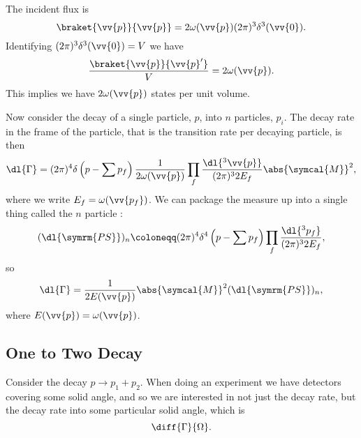 \documentclass[fleqn]{NotesClass}
\newcommand{\amplitude}{\symcal{M}}
\newcommand{\phaseSpaceMeasure}[1][n]{(\dl{\symrm{PS}})_{#1}}
\begin{document}
    The incident flux is
    \begin{equation}
        \braket{\vv{p}}{\vv{p}} = 2\omega(\vv{p}) (2\pi)^3 \delta^3(\vv{0}).
    \end{equation}
    Identifying \((2\pi)^3\delta^3(\vv{0}) = V\) we have
    \begin{equation}
        \frac{\braket{\vv{p}}{\vv{p}'}}{V} = 2\omega(\vv{p}).
    \end{equation}
    This implies we have \(2\omega(\vv{p})\) states per unit volume.
    
    Now consider the decay of a single particle, \(p\), into \(n\) particles, \(p_i\).
    The decay rate in the frame of the particle, that is the transition rate per decaying particle, is then
    \begin{equation}
        \dl{\Gamma} = (2\pi)^4 \delta\left( p - \sum p_f \right) \frac{1}{2\omega(\vv{p})} \prod_f \frac{\dl{^3\vv{p}}}{(2\pi)^32E_f} \abs{\amplitude}^2,
    \end{equation}
    where we write \(E_f = \omega(\vv{p_f})\).
    We can package the measure up into a single thing called the \(n\) particle :
    \begin{equation}
        \phaseSpaceMeasure \coloneqq (2\pi)^4 \delta^4\left( p - \sum p_f \right) \prod_f \frac{\dl{^3p_f}}{(2\pi)^32E_f},
    \end{equation}
    so
    \begin{equation}
        \dl{\Gamma} = \frac{1}{2E(\vv{p})} \abs{\amplitude}^2 \phaseSpaceMeasure,
    \end{equation}
    where \(E(\vv{p}) = \omega(\vv{p})\).
    
    \subsection{One to Two Decay}
    Consider the decay \(p \to p_1 + p_2\).
    When doing an experiment we have detectors covering some solid angle, and so we are interested in not just the decay rate, but the decay rate into some particular solid angle, which is
    \begin{equation}
        \diff{\Gamma}{\Omega}.
    \end{equation}
    
\end{document}
